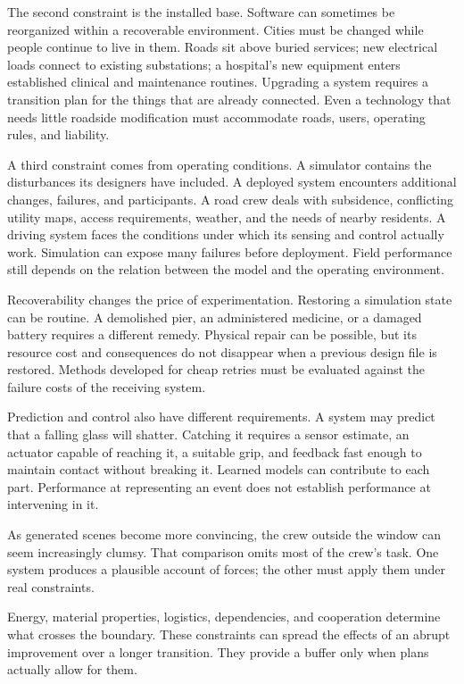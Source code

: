 The second constraint is the installed base. Software can sometimes be reorganized within a recoverable environment. Cities must be changed while people continue to live in them. Roads sit above buried services; new electrical loads connect to existing substations; a hospital's new equipment enters established clinical and maintenance routines. Upgrading a system requires a transition plan for the things that are already connected. Even a technology that needs little roadside modification must accommodate roads, users, operating rules, and liability.

A third constraint comes from operating conditions. A simulator contains the disturbances its designers have included. A deployed system encounters additional changes, failures, and participants. A road crew deals with subsidence, conflicting utility maps, access requirements, weather, and the needs of nearby residents. A driving system faces the conditions under which its sensing and control actually work. Simulation can expose many failures before deployment. Field performance still depends on the relation between the model and the operating environment.


Recoverability changes the price of experimentation. Restoring a simulation state can be routine. A demolished pier, an administered medicine, or a damaged battery requires a different remedy. Physical repair can be possible, but its resource cost and consequences do not disappear when a previous design file is restored. Methods developed for cheap retries must be evaluated against the failure costs of the receiving system.

Prediction and control also have different requirements. A system may predict that a falling glass will shatter. Catching it requires a sensor estimate, an actuator capable of reaching it, a suitable grip, and feedback fast enough to maintain contact without breaking it. Learned models can contribute to each part. Performance at representing an event does not establish performance at intervening in it.

As generated scenes become more convincing, the crew outside the window can seem increasingly clumsy. That comparison omits most of the crew's task. One system produces a plausible account of forces; the other must apply them under real constraints.

 Energy, material properties, logistics, dependencies, and cooperation determine what crosses the boundary. These constraints can spread the effects of an abrupt improvement over a longer transition. They provide a buffer only when plans actually allow for them.

